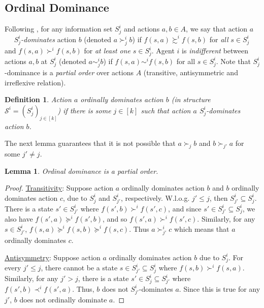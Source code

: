 \documentclass[letterpaper]{article} %
\def\calS{\mathcal{S}}
\newtheorem{lemma}[theorem]{Lemma}
\newtheorem{definition}{Definition}
\begin{document}
\subsection{Ordinal Dominance}
Following \cite{CWX11,RE12,MLR14}, for any information set $S^i_j$ and actions $a,b\in A$, we say that action $a$~~ {\it $S^i_j$-dominates} action $b$ (denoted $a \succ^i_{j} b$) if $f(s,a) \succsim^i f(s,b)$ for \emph{all} $s\in S^i_j$ and $f(s,a) \succ^i f(s,b)$ for \emph{at least one} $s\in S^i_j$. Agent $i$ is \emph{indifferent} between actions $a,b$ at $S^i_j$ (denoted $a \sim^i_{j} b$) if $f(s,a) \sim^i f(s,b)$ for all $s\in S^i_j$. Note that $S^i_j$-dominance is a \emph{partial order} over actions $A$ (transitive, antisymmetric and irreflexive relation).

\begin{definition}
Action $a$ \emph{ordinally dominates} action $b$ (in structure $\calS^i =(S^i_j)_{j\in [k]}$) if
there is some $j \in [k]$ such that action $a$ $S^i_j$-dominates action $b$.
\end{definition}

The next lemma guarantees that it is not possible that $a \succ_j b$ and $b \succ_{j'} a$ for some $j'\neq j$.
\begin{lemma}Ordinal dominance is a partial order.
\end{lemma}
\begin{proof}
\underline{Transitivity}: Suppose action $a$ ordinally dominates action $b$ and $b$ ordinally dominates action $c$, due to $S^i_j$ and $S^i_{j'}$, respectively. W.l.o.g. $j'\leq j$, then $S^i_{j'} \subseteq S^i_{j}$. There is a state $s'\in S^i_{j'}$ where $f(s',b) \succ^i f(s',c)$, and since $s'\in S^i_{j'}\subseteq S^i_{j}$, we also have $f(s',a) \succeq^i f(s',b)$, and so $f(s',a)\succ^i f(s',c)$. Similarly, for any $s\in S^i_{j'}$, $f(s,a) \succeq^i f(s,b) \succeq^i f(s,c)$. Thus $a \succ^i_{j'} c$ which means that $a$ ordinally dominates $c$.

\underline{Antisymmetry}: Suppose action $a$ ordinally dominates action $b$ due to $S^i_j$. For every $j'\leq j$, there cannot be a state $s\in S^i_{j'}\subseteq S^i_j$ where $f(s,b) \succ^i f(s,a)$. Similarly, for any $j'>j$, there is a state $s'\in S^i_j \subseteq S^i_{j'}$ where $f(s',b) \prec^i f(s',a)$. Thus, $b$ does not $S^i_{j'}$-dominates $a$. Since this is true for any $j'$, $b$ does not ordinally dominate $a$.
\end{proof}

\def\celcius{^\circ}
\end{document}
